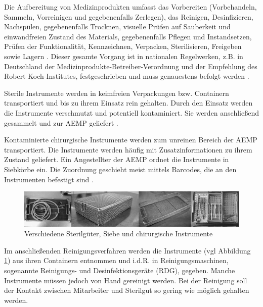 Die Aufbereitung von Medizinprodukten umfasst das Vorbereiten (Vorbehandeln, Sammeln, Vorreinigen und gegebenenfalls Zerlegen), das Reinigen, Desinfizieren, Nachspülen, gegebenenfalls Trocknen, visuelle Prüfen auf Sauberkeit und einwandfreien Zustand des Materials, gegebenenfalls Pflegen und Instandsetzen, Prüfen der Funktionalität, Kennzeichnen, Verpacken, Sterilisieren, Freigeben sowie Lagern \cite{AKI-ArbeitskreisInstrumenten-Aufbereitung2012}. Dieser gesamte Vorgang ist in nationalen Regelwerken, z.B. in Deutschland der Medizinprodukte-Betreiber-Verordnung und der Empfehlung des Robert Koch-Institutes, festgeschrieben und muss genauestens befolgt werden \cite{AKI-ArbeitskreisInstrumenten-Aufbereitung2012}.

Sterile Instrumente werden in keimfreien Verpackungen bzw. Containern transportiert und bis zu ihrem Einsatz rein gehalten. Durch den Einsatz werden die Instrumente verschmutzt und potentiell kontaminiert. Sie werden anschließend gesammelt und zur AEMP geliefert \cite[S.~7]{Ruther2014}.


Kontaminierte chirurgische Instrumente werden zum unreinen Bereich der AEMP transportiert. Die Instrumente werden häufig mit Zusatzinformationen zu ihrem Zustand geliefert. Ein Angestellter der AEMP ordnet die Instrumente in Siebkörbe ein. Die Zuordnung geschieht meist mittels Barcodes, die an den Instrumenten befestigt sind \cite[S.~9]{Ruther2014}.

\begin{figure}[htbp]
    \centering
    \includegraphics[width=1\textwidth]{data/bilder/Sterilgut_Siebe_Quelle_DGSV.pdf}
    \caption{Verschiedene Sterilgüter, Siebe und chirurgische Instrumente \cite{DGSV-DeutscheGesellschaftfurSterilgutversorgung2004}}
    \label{fig:Siebe_In_AEMP}
\end{figure}

Im anschließenden Reinigungsverfahren werden die Instrumente (vgl Abbildung \ref{fig:Siebe_In_AEMP}) aus ihren Containern entnommen und i.d.R. in Reinigungsmaschinen, sogenannte Reinigungs- und Desinfektionsgeräte (RDG), gegeben. Manche Instrumente müssen jedoch von Hand gereinigt werden. Bei der Reinigung soll der Kontakt zwischen Mitarbeiter und Sterilgut so gering wie möglich gehalten werden. 

